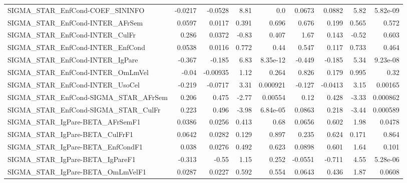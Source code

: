 \begin{tabular}{lrrrrrrrr}
SIGMA\_STAR\_EnfCond-COEF\_SININFO       &     -0.0217 &      -0.0528 &    8.81 &      0.0 &     0.0673 &      0.0882 &         5.82 &      5.82e-09 \\
SIGMA\_STAR\_EnfCond-INTER\_AFrSem       &      0.0597 &       0.0117 &   0.391 &    0.696 &      0.676 &       0.199 &        0.565 &         0.572 \\
SIGMA\_STAR\_EnfCond-INTER\_CulFr        &       0.286 &       0.0372 &   -0.83 &    0.407 &       1.67 &       0.143 &        -0.52 &         0.603 \\
SIGMA\_STAR\_EnfCond-INTER\_EnfCond      &      0.0538 &       0.0116 &   0.772 &     0.44 &      0.547 &       0.117 &        0.733 &         0.464 \\
SIGMA\_STAR\_EnfCond-INTER\_IgPare       &      -0.367 &       -0.185 &    6.83 & 8.35e-12 &     -0.449 &      -0.185 &         5.34 &      9.23e-08 \\
SIGMA\_STAR\_EnfCond-INTER\_OmLmVel      &       -0.04 &     -0.00935 &    1.12 &    0.264 &      0.826 &       0.179 &        0.995 &          0.32 \\
SIGMA\_STAR\_EnfCond-INTER\_UsoCel       &      -0.219 &      -0.0717 &    3.31 & 0.000921 &     -0.127 &     -0.0413 &         3.15 &       0.00165 \\
SIGMA\_STAR\_EnfCond-SIGMA\_STAR\_AFrSem  &       0.206 &        0.475 &   -2.77 &  0.00554 &       0.12 &       0.428 &        -3.33 &      0.000862 \\
SIGMA\_STAR\_EnfCond-SIGMA\_STAR\_CulFr   &       0.223 &        0.496 &   -3.98 & 6.84e-05 &     0.0863 &       0.218 &        -3.44 &      0.000589 \\
SIGMA\_STAR\_IgPare-BETA\_AFrSemF1       &      0.0386 &       0.0256 &   0.413 &     0.68 &     0.0656 &       0.602 &         1.98 &        0.0478 \\
SIGMA\_STAR\_IgPare-BETA\_CulFrF1        &      0.0642 &       0.0282 &   0.129 &    0.897 &      0.235 &       0.624 &        0.171 &         0.864 \\
SIGMA\_STAR\_IgPare-BETA\_EnfCondF1      &       0.038 &       0.0276 &   0.492 &    0.623 &     0.0898 &       0.601 &         1.64 &         0.101 \\
SIGMA\_STAR\_IgPare-BETA\_IgPareF1       &      -0.313 &        -0.55 &    1.15 &    0.252 &    -0.0551 &      -0.711 &         4.55 &      5.28e-06 \\
SIGMA\_STAR\_IgPare-BETA\_OmLmVelF1      &      0.0287 &       0.0227 &   0.592 &    0.554 &     0.0643 &       0.436 &         1.87 &        0.0608 \\

\end{tabular}
